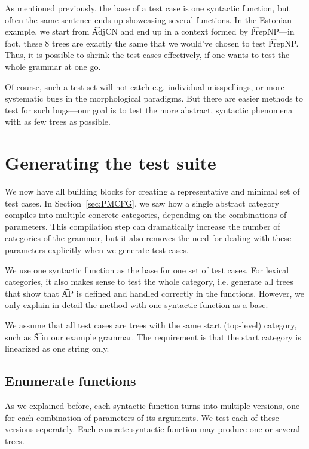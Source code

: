 As mentioned previously, the base of a test case is one syntactic
function, but often the same sentence ends up showcasing several
functions. In the Estonian example, we start from \t{AdjCN} 
and end up in a context formed by \t{PrepNP}---in fact, these 8 trees
are exactly the same that we would've chosen to test \t{PrepNP}. Thus,
it is possible to shrink the test cases effectively, if one wants to
test the whole grammar at one go.

Of course, such a test set will not catch e.g. individual
misspellings, or more systematic bugs in the morphological
paradigms. But there are easier methods to test for such bugs---our 
goal is to test the more abstract, syntactic phenomena with as few
trees as possible.  


\section{Generating the test suite}
\label{sec:testing}

We now have all building blocks for creating a representative and
minimal set of test cases.
In Section~\ref{sec:PMCFG}, we saw how a single abstract category
compiles into multiple concrete categories, depending on the
combinations of parameters. This compilation step can dramatically
increase the number of categories of the grammar, but it also removes
the need for dealing with these parameters explicitly when we generate
test cases. 

We use one syntactic function as the base for one set of test
cases. For lexical categories, it also makes sense to test the whole
category, i.e. generate all trees that show that \t{AP} is defined and
handled correctly in the functions. However, we only explain in detail
the method with one syntactic function as a base.

We assume that all test cases are trees with the same start
(top-level) category, such as \t{S} in our example grammar. The
requirement is that the start category is linearized as one string only. 

\subsection{Enumerate functions} As we explained before, each syntactic
function turns into multiple versions, one for each combination of
parameters of its arguments. We test each of these versions
seperately. Each concrete syntactic function may produce one or several trees.

